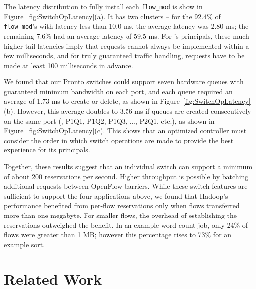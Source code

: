 The latency distribution to fully install each \verb/flow_mod/ is show in
Figure~\ref{fig:SwitchOpLatency}(a). It has two clusters -- for the 92.4\% of
\verb/flow_mod/'s with latency less than 10.0 ms, the average latency
was 2.80 ms; the remaining 7.6\% had an average latency of 59.5 ms.
For \sys's principals, these much higher tail latencies imply that requests
cannot always be implemented within a few milliseconds, and for truly
guaranteed traffic handling, requests have to be made at least 100
milliseconds in advance.

We found that our Pronto switches could support seven hardware
queues with guaranteed minimum bandwidth on each port, and each
queue required an average of 1.73 ms to create or delete, as shown in
Figure~\ref{fig:SwitchOpLatency}(b). However, this average doubles to 3.56 ms
if queues are created consecutively on the same port (\ie, P1Q1, P1Q2,
P1Q3, ..., P2Q1, etc.), as shown in Figure~\ref{fig:SwitchOpLatency}(c).
This shows that an optimized \sys controller must consider the order in
which switch operations are made to provide the best experience for
its principals.

Together, these results suggest that an
individual switch can support a minimum of about 200 reservations
per second. Higher throughput is possible by batching additional requests
between OpenFlow barriers.
While these switch features are sufficient to support the four applications
above, we found that Hadoop's performance benefited from per-flow
reservations only when flows transferred more than one megabyte. For
smaller flows, the overhead of establishing the reservations outweighed
the benefit.
In an example word count job, only 24\% of flows were greater
than 1 MB; however this percentage rises to 73\% for an example sort.

\section{Related Work}
\label{sec:related-work}




